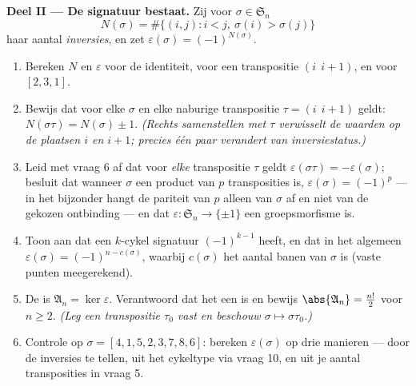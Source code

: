 \begin{problem}
\medskip
\noindent\textbf{Deel II --- De signatuur bestaat.} Zij voor $\sigma \in
\mathfrak S_n$
\[
N(\sigma) = \#\bigl\{(i, j) : i < j,\ \sigma(i) >
\sigma(j)\bigr\}
\]
haar aantal \emph{inversies}, en zet $\varepsilon(\sigma) =
(-1)^{N(\sigma)}$.
\begin{enumerate}[resume]
  \item Bereken $N$ en $\varepsilon$ voor de identiteit, voor een
        transpositie $(i\ \ i{+}1)$, en voor $[2, 3, 1]$.
  \item Bewijs dat voor elke $\sigma$ en elke naburige transpositie
        $\tau = (i\ \ i{+}1)$ geldt: $N(\sigma\tau) = N(\sigma) \pm 1$.
        \emph{(Rechts samenstellen met $\tau$ verwisselt de waarden op
        de plaatsen $i$ en $i + 1$; precies één paar verandert van
        inversiestatus.)}
  \item Leid met vraag 6 af dat voor \emph{elke} transpositie $\tau$
        geldt $\varepsilon(\sigma\tau) = -\varepsilon(\sigma)$; besluit
        dat wanneer $\sigma$ een product van $p$ transposities is,
        $\varepsilon(\sigma) = (-1)^p$ --- in het bijzonder hangt de
        pariteit van $p$ alleen van $\sigma$ af en niet van de gekozen
        ontbinding --- en dat $\varepsilon \colon \mathfrak S_n \to
        \{\pm 1\}$ een groepsmorfisme is.
  \item Toon aan dat een $k$-cykel signatuur $(-1)^{k-1}$ heeft, en dat
        in het algemeen $\varepsilon(\sigma) = (-1)^{n - c(\sigma)}$,
        waarbij $c(\sigma)$ het aantal banen van $\sigma$ is (vaste
        punten meegerekend).
  \item De \emph{} is $\mathfrak A_n =
        \ker\varepsilon$. Verantwoord dat het een  is en bewijs
        $\abs{\mathfrak A_n} = \frac{n!}2$ voor $n \geq 2$. \emph{(Leg
        een transpositie $\tau_0$ vast en beschouw $\sigma \mapsto
        \sigma\tau_0$.)}
  \item Controle op $\sigma = [4, 1, 5, 2, 3, 7, 8, 6]$: bereken
        $\varepsilon(\sigma)$ op drie manieren --- door de inversies te
        tellen, uit het cykeltype via vraag 10, en uit je aantal
        transposities in vraag 5.
\end{enumerate}


\end{problem}
